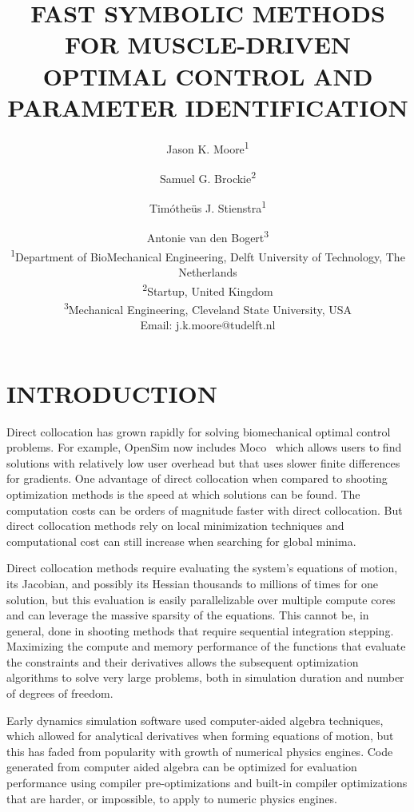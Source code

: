 \documentclass[11pt,twocolumn]{article}
\title{\textbf{
  FAST SYMBOLIC METHODS FOR MUSCLE-DRIVEN\\
  OPTIMAL CONTROL AND PARAMETER IDENTIFICATION
}}
\author{
Jason K. Moore\textsuperscript{1}\and
Samuel G. Brockie\textsuperscript{2}\and
Timótheüs J. Stienstra\textsuperscript{1}\and
Antonie van den Bogert\textsuperscript{3}\\
\textsuperscript{1}Department of BioMechanical Engineering, Delft University of Technology, The Netherlands\\
\textsuperscript{2}Startup, United Kingdom\\
\textsuperscript{3}Mechanical Engineering, Cleveland State University, USA\\
Email: j.k.moore@tudelft.nl}
\date{}
\begin{document}
\pagestyle{fancy}
\lhead{}
\maketitle
\section*{INTRODUCTION}
%
Direct collocation has grown rapidly for solving biomechanical optimal control
problems. For example, OpenSim now includes Moco~\cite{Dembia2019} which allows
users to find solutions with relatively low user overhead but that uses slower finite differences for gradients. One advantage of
direct collocation when compared to shooting optimization methods is the speed
at which solutions can be found. The computation costs can be orders of
magnitude faster with direct collocation. But direct collocation methods rely on
local minimization techniques and computational cost can still increase when
searching for global minima.

Direct collocation methods require evaluating the system's equations of motion,
its Jacobian, and possibly its Hessian thousands to millions of times for one
solution, but this evaluation is easily parallelizable over multiple compute
cores and can leverage the massive sparsity of the equations. This cannot be, in
general, done in shooting methods that require sequential integration stepping.
Maximizing the compute and memory performance of the functions that evaluate the
constraints and their derivatives allows the subsequent optimization algorithms
to solve very large problems, both in simulation duration and number of degrees
of freedom.

Early dynamics simulation software used computer-aided algebra techniques, which
allowed for analytical derivatives when forming equations of motion, but this
has faded from popularity with growth of numerical physics engines. Code
generated from computer aided algebra can be optimized for evaluation
performance using compiler pre-optimizations and built-in compiler optimizations
that are harder, or impossible, to apply to numeric physics engines.
\end{document}
